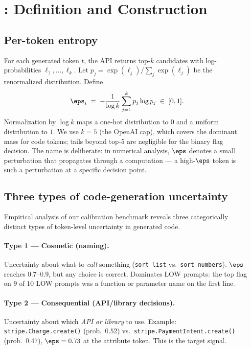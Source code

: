 \section{\eps: Definition and Construction}
\label{sec:epsilon}

\subsection{Per-token entropy}
\label{subsec:per-token}

For each generated token $t$, the API returns top-$k$ candidates with
log-probabilities $\ell_1, \dots, \ell_k$. Let
$p_j = \exp(\ell_j) / \sum_j \exp(\ell_j)$ be the renormalized
distribution. Define
\begin{equation}
    \eps_t \;=\; -\frac{1}{\log k} \sum_{j=1}^{k} p_j \log p_j \;\in\; [0,1].
    \label{eq:eps}
\end{equation}
Normalization by $\log k$ maps a one-hot distribution to $0$ and a
uniform distribution to $1$. We use $k=5$ (the OpenAI cap), which
covers the dominant mass for code tokens; tails beyond top-5 are
negligible for the binary flag decision. The name is
deliberate: in numerical analysis, $\eps$ denotes a small perturbation
that propagates through a computation --- a high-$\eps$ token is such
a perturbation at a specific decision point.

\subsection{Three types of code-generation uncertainty}
\label{subsec:types}

Empirical analysis of our calibration benchmark reveals three categorically
distinct types of token-level uncertainty in generated code.

\paragraph{Type 1 --- Cosmetic (naming).} Uncertainty about what to
\emph{call} something (\texttt{sort\_list} vs.\ \texttt{sort\_numbers}).
$\eps$ reaches $0.7$--$0.9$, but any choice is correct. Dominates LOW
prompts: the top flag on $9$ of $10$ LOW prompts was a function or
parameter name on the first line.

\paragraph{Type 2 --- Consequential (API/library decisions).}
Uncertainty about which \emph{API or library} to use. Example:
\texttt{stripe.Charge.create()} (prob.\ $0.52$) vs.\
\texttt{stripe.PaymentIntent.create()} (prob.\ $0.47$), $\eps = 0.73$
at the attribute token. This is the target signal.

